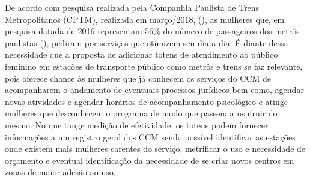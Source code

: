 De acordo com pesquisa realizada pela Companhia Paulista de Trens Metropolitanos (CPTM), realizada em março/2018, (\cite{cptm-demandas-publico-feminino}), as mulheres que, em pesquisa datada de 2016 representam 56\% do número de passageiros dos metrôs paulistas (\cite{pesquisa-de-caracterizacao-socioeconomica-do-usuario}), pediram por serviços que otimizem seu dia-a-dia. É diante dessa necessidade que a proposta de adicionar totens de atendimento ao público feminino em estações de transporte público como metrôs e trens se faz relevante, pois oferece chance às mulheres que já conhecem os serviços do CCM de acompanharem o andamento de eventuais processos jurídicos bem como, agendar novas atividades e agendar horários de acompanhamento psicológico e atinge mulheres que desconhecem o programa de modo que passem a usufruir do mesmo.
No que tange medição de efetividade, os totens podem fornecer informações a um registro geral dos CCM sendo possível identificar as estações onde existem mais mulheres carentes do serviço, metrificar o uso e necessidade de orçamento e eventual identificação da necessidade de se criar novos centros em zonas de maior adesão ao uso.
\newpage

